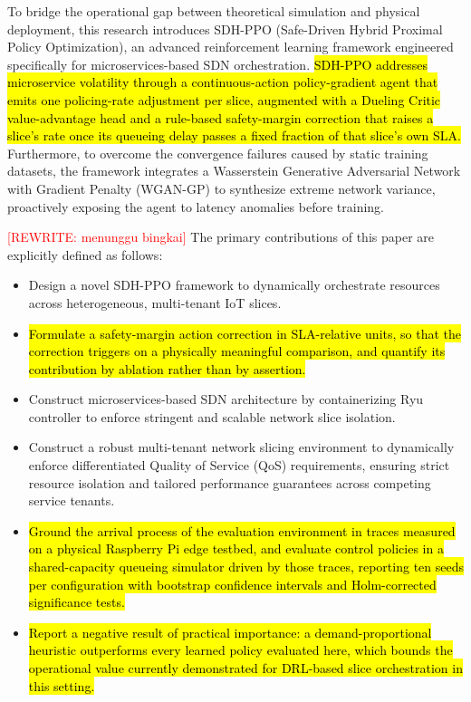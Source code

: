 \documentclass[conference]{IEEEtran}
\newcommand{\rev}[1]{\hl{#1}}
\begin{document}
To bridge the operational gap between theoretical simulation and physical deployment, this research introduces SDH-PPO (Safe-Driven Hybrid Proximal Policy Optimization), an advanced reinforcement learning framework engineered specifically for microservices-based SDN orchestration. \rev{SDH-PPO addresses microservice volatility through a continuous-action policy-gradient agent that emits one policing-rate adjustment per slice, augmented with a Dueling Critic value-advantage head and a rule-based safety-margin correction that raises a slice's rate once its queueing delay passes a fixed fraction of that slice's own SLA.} Furthermore, to overcome the convergence failures caused by static training datasets, the framework integrates a Wasserstein Generative Adversarial Network with Gradient Penalty (WGAN-GP) to synthesize extreme network variance, proactively exposing the agent to latency anomalies before training.

\textcolor{red}{[REWRITE: menunggu bingkai]} The primary contributions of this paper are explicitly defined as follows:

\begin{itemize}
\item
  Design a novel SDH-PPO framework to dynamically orchestrate resources across heterogeneous, multi-tenant IoT slices.
\item
  \rev{Formulate a safety-margin action correction in SLA-relative units, so that the correction triggers on a physically meaningful comparison, and quantify its contribution by ablation rather than by assertion.}
\item
  Construct microservices-based SDN architecture by containerizing Ryu controller to enforce stringent and scalable network slice isolation.
\item
  Construct a robust multi-tenant network slicing environment to dynamically enforce differentiated Quality of Service (QoS) requirements, ensuring strict resource isolation and tailored performance guarantees across competing service tenants.
\item
  \rev{Ground the arrival process of the evaluation environment in traces measured on a physical Raspberry Pi edge testbed, and evaluate control policies in a shared-capacity queueing simulator driven by those traces, reporting ten seeds per configuration with bootstrap confidence intervals and Holm-corrected significance tests.}
\item
  \rev{Report a negative result of practical importance: a demand-proportional heuristic outperforms every learned policy evaluated here, which bounds the operational value currently demonstrated for DRL-based slice orchestration in this setting.}
\end{itemize}
\end{document}
